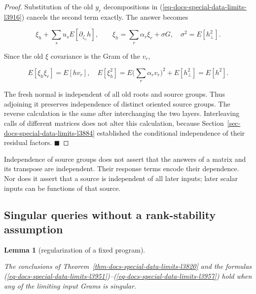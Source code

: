 \documentclass[
  11pt,
]{article}
\theoremstyle{definition}
\theoremstyle{plain}
\theoremstyle{plain}
\theoremstyle{plain}
\newtheorem{lemma}{Lemma}[section]
\theoremstyle{remark}
\begin{document}
\begin{proof}
Substitution of the old \(y_r\) decompositions in
(\ref{eq-docs-special-data-limits-l3916}) cancels the second term
exactly. The answer becomes

\[
\xi_h+\sum_su_sE[\partial_{\zeta_s}h],
\qquad
\xi_h=\sum_r\alpha_r\xi_r+\sigma G,
\quad \sigma^2=E[h_\perp^2].
\]

Since the old \(\xi\) covariance is the Gram of the \(v_r\),

\[
E[\xi_h\xi_r]=E[hv_r],
\quad
E[\xi_h^2]=E\Big(\sum_r\alpha_rv_r\Big)^2+E[h_\perp^2]=E[h^2].
\]

The fresh normal is independent of all old roots and source groups. Thus
adjoining it preserves independence of distinct oriented source groups.
The reverse calculation is the same after interchanging the two layers.
Interleaving calls of different matrices does not alter this
calculation, because Section~\ref{sec-docs-special-data-limits-l3884}
established the conditional independence of their residual factors.
\(\blacksquare\)
\end{proof}

Independence of source groups does not assert that the answers of a
matrix and its transpose are independent. Their response terms encode
their dependence. Nor does it assert that a source is independent of all
later inputs; later scalar inputs can be functions of that source.

\subsection{Singular queries without a rank-stability
assumption}\label{sec-docs-special-data-limits-l4009}

\begin{lemma}[regularization of a fixed
program]\protect\hypertarget{lem-docs-special-data-limits-l4011}{}\label{lem-docs-special-data-limits-l4011}

The conclusions of Theorem~\ref{thm-docs-special-data-limits-l3820} and
the formulas
(\ref{eq-docs-special-data-limits-l3951})--(\ref{eq-docs-special-data-limits-l3957})
hold when any of the limiting input Grams is singular.

\end{lemma}

\protect{}\label{proof-docs-special-data-limits-l4013}{}
\end{document}
